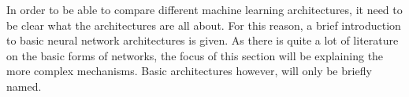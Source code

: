 In order to be able to compare different machine learning architectures, it need to be clear what the architectures are all about. 
For this reason, a brief introduction to basic neural network architectures is given. 
As there is quite a lot of literature on the basic forms of networks, the focus of this section will be explaining the more complex mechanisms.
Basic architectures however, will only be briefly named. 

